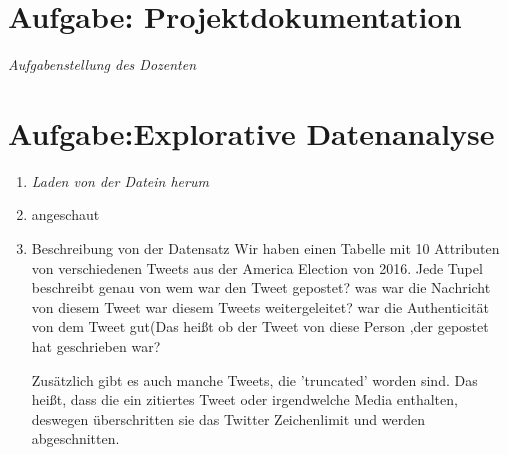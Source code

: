 \usepackage{graphicx}

\newcommand{\dozent}{Prof.  Dr.  Agnès Voisard, Nicolas Lehmann}					%
\newcommand{\tutor}{Hoffman Christian}						%
\newcommand{\tutoriumNo}{Tutorium 3}				%
\newcommand{\projectNo}{1}									%
\newcommand{\veranstaltung}{Datenbank Systeme}	%
\newcommand{\semester}{SoeSe 2017}						%
\newcommand{\studenten}{IngridTchilibou,Emil,Boyan Hristov}			%





\section{Aufgabe: Projektdokumentation}
{\itshape Aufgabenstellung des Dozenten}



\section{Aufgabe:Explorative Datenanalyse}
\begin{enumerate}[1)]
\item {\itshape Laden von der Datein herum}
\item{angeschaut}
\item{Beschreibung von der Datensatz}
Wir haben einen Tabelle mit 10 Attributen von verschiedenen Tweets aus der America Election von 2016. Jede Tupel beschreibt genau von wem war den Tweet gepostet? was war die Nachricht von diesem Tweet war diesem Tweets weitergeleitet? war die Authenticität von dem Tweet gut(Das heißt ob der Tweet von diese Person ,der gepostet hat geschrieben war?

Zusätzlich gibt es auch manche Tweets, die 'truncated' worden sind. Das heißt, dass die ein zitiertes Tweet oder irgendwelche Media enthalten, deswegen überschritten sie das Twitter Zeichenlimit und werden abgeschnitten. 

\end{enumerate}

